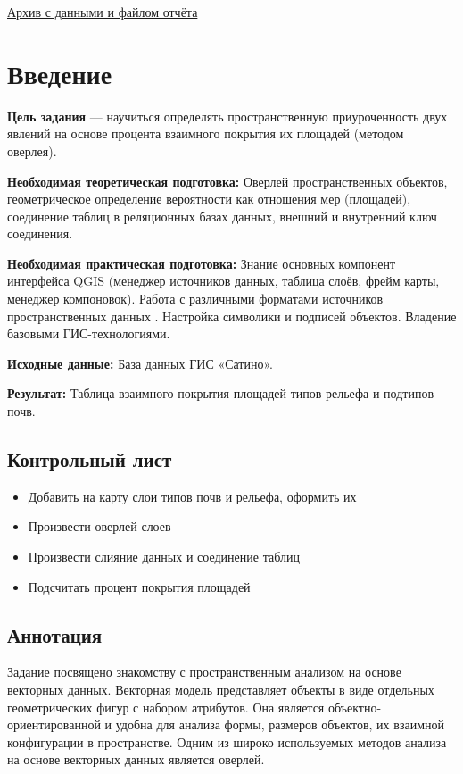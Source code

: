 \documentclass[
  12pt,
]{book}
\providecommand{\tightlist}{%
  \setlength{\itemsep}{0pt}\setlength{\parskip}{0pt}}
\begin{document}
\href{https://1drv.ms/u/s!AmtmZDq3JgxHgZYNAX886rcJmcJoiw?e=70M3MA}{Архив с данными и файлом отчёта}

\hypertarget{overlay-intro}{%
\section{Введение}\label{overlay-intro}}

\textbf{Цель задания} --- научиться определять пространственную приуроченность двух явлений на основе процента взаимного покрытия их площадей (методом оверлея).

\textbf{Необходимая теоретическая подготовка:} Оверлей пространственных объектов, геометрическое определение вероятности как отношения мер (площадей), соединение таблиц в реляционных базах данных, внешний и внутренний ключ соединения.

\textbf{Необходимая практическая подготовка:} Знание основных компонент интерфейса QGIS (менеджер источников данных, таблица слоёв, фрейм карты, менеджер компоновок). Работа с различными форматами источников пространственных данных . Настройка символики и подписей объектов. Владение базовыми ГИС-технологиями.

\textbf{Исходные данные:} База данных ГИС «Сатино».

\textbf{Результат:} Таблица взаимного покрытия площадей типов рельефа и подтипов почв.

\hypertarget{overlay-control}{%
\subsection{Контрольный лист}\label{overlay-control}}

\begin{itemize}
\tightlist
\item
  Добавить на карту слои типов почв и рельефа, оформить их
\item
  Произвести оверлей слоев
\item
  Произвести слияние данных и соединение таблиц
\item
  Подсчитать процент покрытия площадей
\end{itemize}

\hypertarget{overlay-annotation}{%
\subsection{Аннотация}\label{overlay-annotation}}

Задание посвящено знакомству с пространственным анализом на основе векторных данных. Векторная модель представляет объекты в виде отдельных геометрических фигур с набором атрибутов. Она является объектно-ориентированной и удобна для анализа формы, размеров объектов, их взаимной конфигурации в пространстве. Одним из широко используемых методов анализа на основе векторных данных является оверлей.
\end{document}
